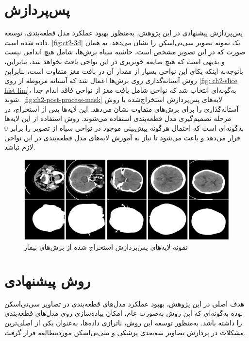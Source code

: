 \section{پس‌پردازش}
\label{ch2-post-process}
پس‌پردازش پیشنهادی در این پژوهش، به‌منظور بهبود عملکرد مدل قطعه‌بندی، توسعه داده شده است.
\autoref{fig:ct2-3d}
یک نمونه تصویر سی‌تی‌اسکن را نشان می‌دهد. به همان‌ صورت که در این تصویر مشخص است،‌ حاشیه سیاه برش‌ها، شامل هیچ اندامی نیست و بدیهی است که هیچ ضایعه خونریزی در این نواحی یافت نخواهد شد، بنابراین، با‌توجه‌‌به اینکه یکای 
 این نواحی بسیار از مقدار آن در بافت مغز متفاوت است، بنابراین روش آستانه‌گذاری روی برش‌ها اعمال شد که آستانه مربوطه از روی 
\autoref{fig: ch2-slice hist lim}،
به‌گونه‌ای انتخاب شد که نواحی شامل بافت مغز از نواحی فاقد اندام جدا شوند.
\autoref{fig:ch2-post-process-mask}
لایه‌های پس‌پردازش استخراج‌شده با روش آستانه‌گذاری را برای برش‌های متفاوت نشان می‌دهد. این لایه‌ها پس از استخراج، در مرحله تصمیم‌گیری مدل قطعه‌بندی استفاده می‌شوند. روش استفاده از این لایه‌ها به‌گونه‌ای است که احتمال هرگونه پیش‌بینی موجود در نواحی سیاه از تصویر را برابر
$ 0$ 
قرار می‌دهد و باعث می‌شود تا نیاز به آموزش لایه‌های مدل قطعه‌بندی  در این نواحی لازم نباشد.




\begin{figure}[h]
\centering
\includegraphics[width=1.0\linewidth]{"Images/Chapter2/post-process mask"}
\caption{نمونه لایه‌های پس‌پردازش استخراج شده از برش‌های بیمار}
\label{fig:ch2-post-process-mask}
\end{figure}




\section{روش پیشنهادی}
هدف اصلی در این پژوهش،‌ بهبود عملکرد مدل‌های قطعه‌بندی در تصاویر سی‌تی‌اسکن بوده به‌گونه‌ای که این روش به‌صورت عام، امکان پیاده‌سازی روی مدل‌های قطعه‌بندی را داشته باشد. به‌منظور توسعه این روش،‌ ناترازی داده‌ها،‌ به‌عنوان یکی از اصلی‌ترین مشکلات در پردازش تصاویر سه‌بعدی پزشکی و سی‌تی‌اسکن موردمطالعه قرار گرفت.

